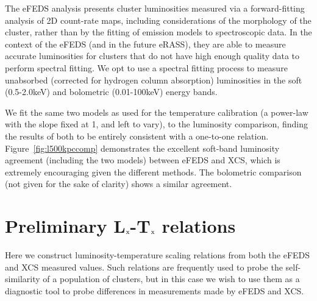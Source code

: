 \documentclass[fleqn,usenatbib]{mnras}
\begin{document}
The eFEDS analysis presents cluster luminosities measured via a forward-fitting analysis of 2D count-rate maps, including considerations of the morphology of the cluster, rather than by the fitting of emission models to spectroscopic data. In the context of the eFEDS (and in the future eRASS), they are able to measure accurate luminosities for clusters that do not have high enough quality data to perform spectral fitting. We opt to use a spectral fitting process to measure unabsorbed (corrected for hydrogen column absorption) luminosities in the soft (0.5-2.0keV) and bolometric (0.01-100keV) energy bands.

We fit the same two models as used for the temperature calibration (a power-law with the slope fixed at 1, and left to vary), to the luminosity comparison, finding the results of both to be entirely consistent with a one-to-one relation. Figure~\ref{fig:l500kpccomp} demonstrates the excellent soft-band luminosity agreement (including the two models) between eFEDS and XCS, which is extremely encouraging given the different methods. The bolometric comparison (not given for the sake of clarity) shows a similar agreement.

\section{Preliminary L$_{\rm{x}}$-T$_{\rm{x}}$ relations}
\label{sec:prelimLT}

Here we construct luminosity-temperature scaling relations from both the eFEDS and XCS measured values. Such relations are frequently used to probe the self-similarity of a population of clusters, but in this case we wish to use them as a diagnostic tool to probe differences in measurements made by eFEDS and XCS.
\end{document}
